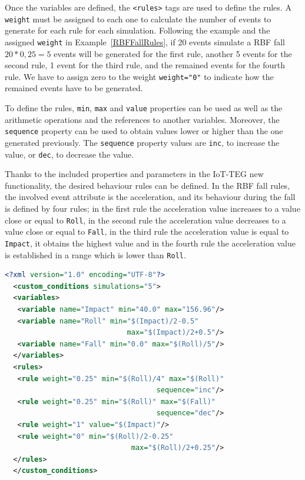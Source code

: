 \documentclass[conference]{IEEEtran}
\theoremstyle{definition}
\begin{document}
Once the variables are defined, the \texttt{<rules>} tags are used to define the rules. A \texttt{weight}
must be assigned to each one to calculate the number of events to generate for each rule for each simulation.
Following the example and the assigned \texttt{weight} in Example~\ref{RBFFallRules}, if 20 events simulate 
a RBF fall $20 * 0,25 = 5$ events will be generated for the first rule, another 5 events for the second rule,
1 event for the third rule, and the remained events for the fourth rule. We have to assign zero to the weight
\texttt{weight="0"} to indicate how the remained events have to be generated.

To define the rules, \texttt{min}, \texttt{max} and \texttt{value} properties can be used as well as the arithmetic 
operations and the references to another variables. Moreover, the \texttt{sequence} property can be used to obtain
values lower or higher than the one generated previously. The \texttt{sequence} property values are \texttt{inc}, 
to increase the value, or \texttt{dec}, to decrease the value.

Thanks to the included properties and parameters in the IoT-TEG new functionality, the desired behaviour rules can
be defined. In the RBF fall rules, the involved event attribute is the acceleration, and its behaviour during the 
fall is defined by four rules; in the first rule the acceleration value increases to a value close or equal to \texttt{Roll},
in the second rule the acceleration value decreases to a value close or equal to \texttt{Fall}, in the third rule the 
acceleration value is equal to \texttt{Impact}, it obtains the highest value and in the fourth rule the acceleration value
is established in a range which is lower than \texttt{Roll}.

\begin{lstlisting}[basicstyle=\ttfamily\footnotesize,language=XML,caption={Rules to define a RBF fall},label=RBFFallRules]
  <?xml version="1.0" encoding="UTF-8"?>
  <custom_conditions simulations="5">
  <variables>
   <variable name="Impact" min="40.0" max="156.96"/>
   <variable name="Roll" min="$(Impact)/2-0.5" 
                             max="$(Impact)/2+0.5"/>
   <variable name="Fall" min="0.0" max="$(Roll)/5"/>
  </variables>
  <rules>
   <rule weight="0.25" min="$(Roll)/4" max="$(Roll)" 
                                    sequence="inc"/>
   <rule weight="0.25" min="$(Roll)" max="$(Fall)" 
                                    sequence="dec"/>
   <rule weight="1" value="$(Impact)"/>
   <rule weight="0" min="$(Roll)/2-0.25" 
                              max="$(Roll)/2+0.25"/>
  </rules>
  </custom_conditions>
\end{lstlisting}
\end{document}
